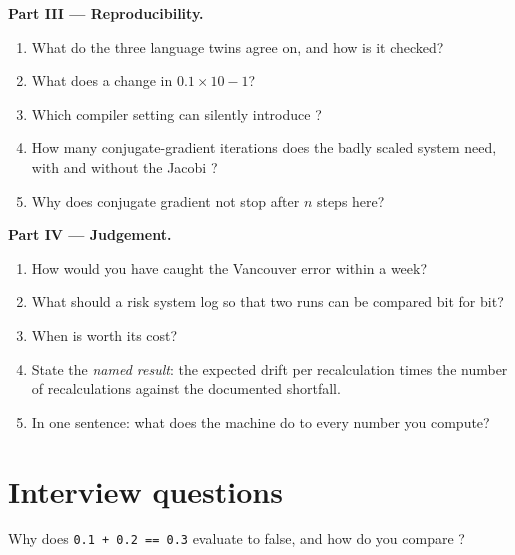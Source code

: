 \begin{problem}
\medskip\noindent\textbf{Part III --- Reproducibility.}
\begin{enumerate}[resume]
\item What do the three language twins agree on, and how is it checked?
\item What does a  change in $0.1 \times 10 - 1$?
\item Which compiler setting can silently introduce ?
\item How many conjugate-gradient iterations does the badly scaled system need, with and without the Jacobi ?
\item Why does conjugate gradient not stop after $n$ steps here?
\end{enumerate}

\medskip\noindent\textbf{Part IV --- Judgement.}
\begin{enumerate}[resume]
\item How would you have caught the Vancouver error within a week?
\item What should a risk system log so that two runs can be compared bit for bit?
\item When is  worth its cost?
\item State the \emph{named result}: the expected drift per recalculation times the number of recalculations against the documented shortfall.
\item In one sentence: what does the machine do to every number you compute?
\end{enumerate}
\end{problem}

\section{Interview questions}

\begin{interviewq}\label{iq:qm:floating-point-and-numerical-linear-algebra:1}
Why does \texttt{0.1 + 0.2 == 0.3} evaluate to false, and how do you compare ?
\end{interviewq}

